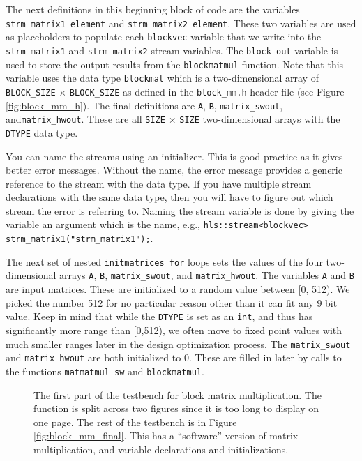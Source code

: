 The next definitions in this beginning block of code are the variables \lstinline{strm_matrix1_element} and \lstinline{strm_matrix2_element}. These two variables are used as placeholders to populate each \lstinline{blockvec} variable that we write into the \lstinline{strm_matrix1} and \lstinline{strm_matrix2} stream variables. The \lstinline{block_out} variable is used to store the output results from the \lstinline{blockmatmul} function. Note that this variable uses the data type \lstinline{blockmat} which is a two-dimensional array of \lstinline{BLOCK_SIZE} $\times$ \lstinline{BLOCK_SIZE} as defined in the \lstinline{block_mm.h} header file (see Figure \ref{fig:block_mm_h}). The final definitions are \lstinline{A},  \lstinline{B},  \lstinline{matrix_swout},  and\lstinline{matrix_hwout}. These are all \lstinline{SIZE} $\times$ \lstinline{SIZE} two-dimensional arrays with the \lstinline{DTYPE} data type. 

\begin{aside}
You can name the streams using an initializer. This is good practice as it gives better error messages. Without the name, the error message provides a generic reference to the stream with the data type. If you have multiple stream declarations with the same data type, then you will have to figure out which stream the error is referring to. Naming the stream variable is done by giving the variable an argument which is the name, e.g., \lstinline{hls::stream<blockvec> strm_matrix1("strm_matrix1");}.
\end{aside}

The next set of nested \lstinline{initmatrices for} loops sets the values of the four two-dimensional arrays \lstinline{A}, \lstinline{B}, \lstinline{matrix_swout}, and \lstinline{matrix_hwout}. The variables \lstinline{A} and \lstinline{B} are input matrices. These are initialized to a random value between [0, 512). We picked the number 512 for no particular reason other than it can fit any 9 bit value. Keep in mind that while the \lstinline{DTYPE} is set as an \lstinline{int}, and thus has significantly more range than [0,512), we often move to fixed point values with much smaller ranges later in the design optimization process. The \lstinline{matrix_swout} and \lstinline{matrix_hwout} are both initialized to $0$. These are filled in later by calls to the functions \lstinline{matmatmul_sw} and \lstinline{blockmatmul}.

\begin{figure}

\caption{  The first part of the testbench for block matrix multiplication. The function is split across two figures since it is too long to display on one page. The rest of the testbench is in Figure \ref{fig:block_mm_final}. This has a ``software'' version of matrix multiplication, and variable declarations and initializations. }
\label{fig:block_mm_init}
\end{figure}

